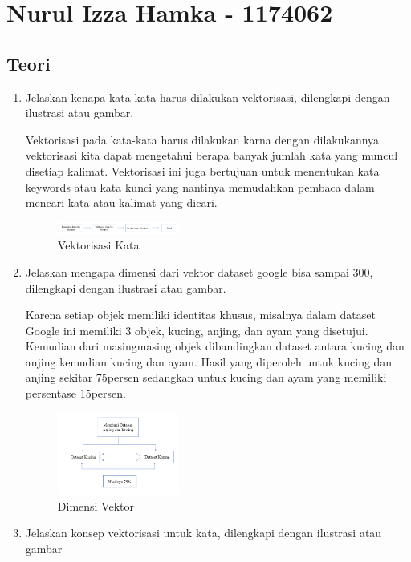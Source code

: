 \section{Nurul Izza Hamka - 1174062}
\subsection{Teori}
\begin{enumerate}

\item Jelaskan kenapa kata-kata harus dilakukan vektorisasi, dilengkapi dengan ilustrasi atau gambar.

Vektorisasi pada kata-kata harus dilakukan karna dengan dilakukannya vektorisasi kita
dapat mengetahui berapa banyak jumlah kata yang muncul disetiap kalimat. Vektorisasi
ini juga bertujuan untuk menentukan kata keywords atau kata kunci yang nantinya
memudahkan pembaca dalam mencari kata atau kalimat yang dicari.

\begin{figure}
	\includegraphics[width=4cm]{figures/1174062/5/teori1.png}
	\centering
	\caption{Vektorisasi Kata}
\end{figure}

\item Jelaskan mengapa dimensi dari vektor dataset google bisa sampai 300, dilengkapi dengan ilustrasi atau gambar.

Karena setiap objek memiliki identitas khusus, misalnya dalam dataset Google ini
memiliki 3 objek, kucing, anjing, dan ayam yang disetujui. Kemudian dari masingmasing objek dibandingkan dataset antara kucing dan anjing kemudian kucing dan
ayam. Hasil yang diperoleh untuk kucing dan anjing sekitar 75persen sedangkan untuk
kucing dan ayam yang memiliki persentase 15persen.

\begin{figure}
	\includegraphics[width=4cm]{figures/1174062/5/teori2.png}
	\centering
	\caption{Dimensi Vektor}
\end{figure}

\item Jelaskan konsep vektorisasi untuk kata, dilengkapi dengan ilustrasi atau gambar


\end{enumerate}

